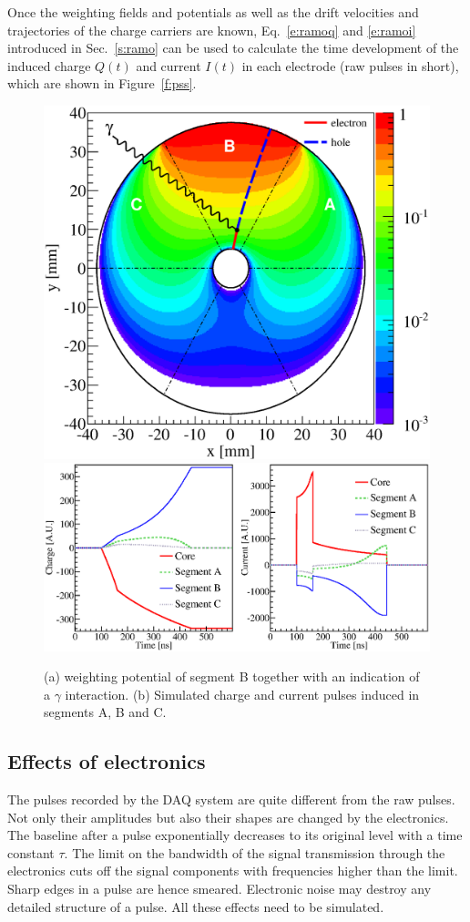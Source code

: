 \documentclass[epj]{svjour}
\begin{document}
Once the weighting fields and potentials as well as the drift
velocities and trajectories of the charge carriers are known,
Eq.~\ref{e:ramoq} and \ref{e:ramoi} introduced in Sec.~\ref{s:ramo}
can be used to calculate the time development of the induced charge
$Q(t)$ and current $I(t)$ in each electrode (raw pulses in short),
which are shown in Figure~\ref{f:pss}.
\begin{figure}\centering
\includegraphics[height=0.23\textheight]{WP}
\includegraphics[height=0.23\textheight]{CIPS}
\caption{(a) weighting potential of segment B together with an
indication of a $\gamma$ interaction. (b) Simulated charge and current
pulses induced in segments A, B and C.}
\label{fig:pss:ps} 
\end{figure}

\subsection{Effects of electronics} 
\label{s:dbn}
The pulses recorded by the DAQ system are quite different from the raw
pulses. Not only their amplitudes but also their shapes are changed by
the electronics. The baseline after a pulse exponentially decreases to
its original level with a time constant $\tau$. The limit on the
bandwidth of the signal transmission through the electronics cuts off
the signal components with frequencies higher than the limit. Sharp
edges in a pulse are hence smeared. Electronic noise may destroy any
detailed structure of a pulse. All these effects need to be simulated.
 
\end{document}
